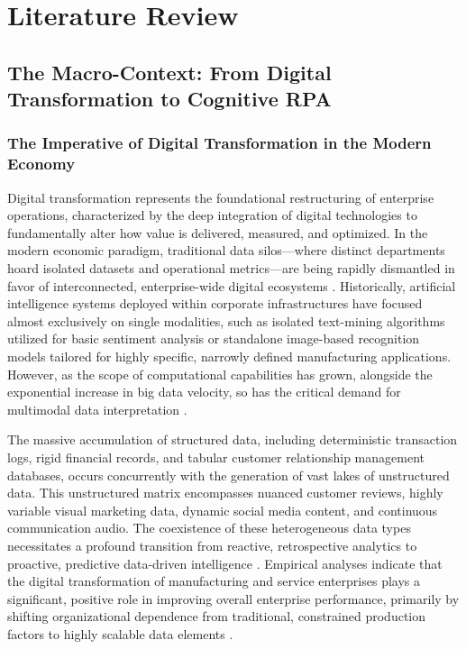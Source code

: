 \section{Literature Review}

\subsection{The Macro-Context: From Digital Transformation to Cognitive RPA}

\subsubsection{The Imperative of Digital Transformation in the Modern Economy}
Digital transformation represents the foundational restructuring of enterprise operations, characterized by the deep integration of digital technologies to fundamentally alter how value is delivered, measured, and optimized. In the modern economic paradigm, traditional data silos—where distinct departments hoard isolated datasets and operational metrics—are being rapidly dismantled in favor of interconnected, enterprise-wide digital ecosystems \parencite{peng2022digital}. Historically, artificial intelligence systems deployed within corporate infrastructures have focused almost exclusively on single modalities, such as isolated text-mining algorithms utilized for basic sentiment analysis or standalone image-based recognition models tailored for highly specific, narrowly defined manufacturing applications. However, as the scope of computational capabilities has grown, alongside the exponential increase in big data velocity, so has the critical demand for multimodal data interpretation \parencite{sura2025multimodal}.

The massive accumulation of structured data, including deterministic transaction logs, rigid financial records, and tabular customer relationship management databases, occurs concurrently with the generation of vast lakes of unstructured data. This unstructured matrix encompasses nuanced customer reviews, highly variable visual marketing data, dynamic social media content, and continuous communication audio. The coexistence of these heterogeneous data types necessitates a profound transition from reactive, retrospective analytics to proactive, predictive data-driven intelligence \parencite{gumber2025multimodal}. Empirical analyses indicate that the digital transformation of manufacturing and service enterprises plays a significant, positive role in improving overall enterprise performance, primarily by shifting organizational dependence from traditional, constrained production factors to highly scalable data elements \parencite{peng2022digital}.


